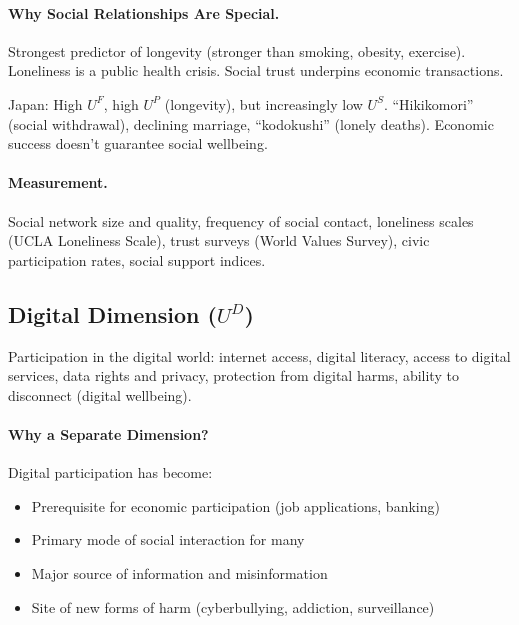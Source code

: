 \paragraph{Why Social Relationships Are Special.}
Strongest predictor of longevity (stronger than smoking, obesity, exercise).
Loneliness is a public health crisis. Social trust underpins economic transactions.

\begin{intuition}
Japan: High $U^F$, high $U^P$ (longevity), but increasingly low $U^S$.
``Hikikomori'' (social withdrawal), declining marriage, ``kodokushi'' (lonely deaths).
Economic success doesn't guarantee social wellbeing.
\end{intuition}

\paragraph{Measurement.}
Social network size and quality, frequency of social contact,
loneliness scales (UCLA Loneliness Scale), trust surveys (World Values Survey),
civic participation rates, social support indices.

\subsection{Digital Dimension ($U^D$)}
\label{sec:fepsde-digital}

\begin{definition}
Participation in the digital world: internet access, digital literacy,
access to digital services, data rights and privacy, protection from digital harms,
ability to disconnect (digital wellbeing).
\end{definition}

\paragraph{Why a Separate Dimension?}
Digital participation has become:
\begin{itemize}[nosep]
  \item Prerequisite for economic participation (job applications, banking)
  \item Primary mode of social interaction for many
  \item Major source of information and misinformation
  \item Site of new forms of harm (cyberbullying, addiction, surveillance)
\end{itemize}

